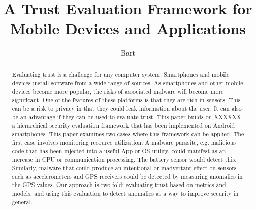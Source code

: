 \documentclass{IEEEtran}
\newcommand{\eat}[1]{}
\newcommand{\sysname}{XXXXXX}
\begin{document}
\title{A Trust Evaluation Framework for Mobile Devices and Applications}
\author{Bart}

\maketitle


\begin{abstract}
Evaluating trust
 is a challenge for any computer system.  Smartphones and mobile devices install software from a 
wide range of sources.  As smartphones and other mobile devices become
more popular, the risks of associated malware will become more significant.
One of the features of these platforms is that they are rich in
sensors.  This can be a risk to privacy in that they could leak information about the user.  It can also be an
advantage if they can be used to evaluate trust.
This paper builds on  \sysname,  a hierarchical security evaluation framework 
that has been implemented on Android smartphones.
This paper examines two cases where this framework can be applied.  
The first case involves monitoring resource utilization.  A malware parasite, e.g. malicious code 
that has been injected into a useful App or OS utility,
could manifest as an increase in CPU or communication processing.
The battery sensor would detect this.  
Similarly, malware that could produce an intentional or inadvertant effect on sensors such as accelerometers
and GPS receivers could be detected
by measuring anomalies in the GPS values.
Our approach is two-fold: evaluating trust based on metrics and models; and 
using this evaluation to detect anomalies as a way to improve security in general.


\eat{For many people, smartphones and other mobile devices serve as a technical interface to the modern world.
These smart devices have embedded on-board sensors, such as accelerometers, gyroscopes, GPS sensors, and
cameras, which are very useful.

This work describes \sysname, a hierarchical framework for checking consistency of sensors 
from multiple devices.  In addition, it relies on Blursense, a dynamic, fine-grained, flexible access
control mechanism, acting as a line of defense that allows users to define and addprivacy filters. 
As a result, the user can expose filtered sensor data to untrusted apps, and researchers can collect 
data in a way that safeguards users' privacy.}  %
\end{abstract}
\end{document}
